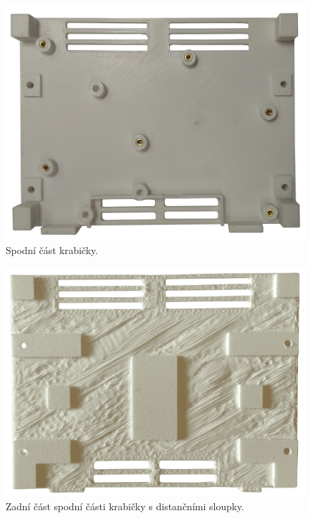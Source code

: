 \begin{figure}[H]
    \centering
    \includegraphics[width=\textwidth]{images/krabicka-nastenny-snimac-prostorove-teploty/krabicka-nastenny-snimac-prostorove-teploty-spodni-cast.png}
    \caption{Spodní část krabičky.}
    \label{fig:krabicka-nastenny-snimac-prostorove-teploty-spodni-cast}
\end{figure}

\begin{figure}[H]
    \centering
    \includegraphics[width=\textwidth]{images/krabicka-nastenny-snimac-prostorove-teploty/krabicka-nastenny-snimac-prostorove-teploty-spodni-cast-zezadu.png}
    \caption{Zadní část spodní části krabičky s distančními sloupky.}
    \label{fig:krabicka-nastenny-snimac-prostorove-teploty-spodni-cast-zezadu}
\end{figure}


